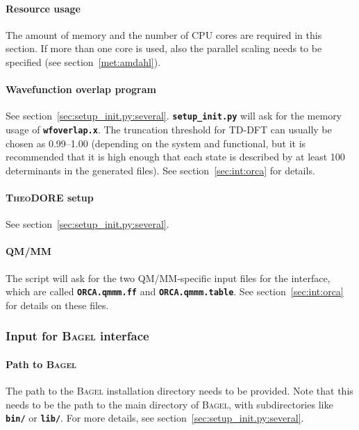 \documentclass[a4paper,10pt,DIV=15,openany]{scrbook}
\newcommand{\ttt}[1]{\textbf{\texttt{#1}}}
\begin{document}
\paragraph{Resource usage}

The amount of memory and the number of CPU cores are required in this section. If more than one core is used, also the parallel scaling needs to be specified (see section~\ref{met:amdahl}).

\paragraph{Wavefunction overlap program}

See section~\ref{sec:setup_init.py:several}. \ttt{setup\_init.py} will ask for the memory usage of \ttt{wfoverlap.x}. The truncation threshold for TD-DFT can usually be chosen as 0.99--1.00 (depending on the system and functional, but it is recommended that it is high enough that each state is described by at least 100 determinants in the generated files). See section~\ref{sec:int:orca} for details.

\paragraph{\textsc{TheoDORE} setup}

See section~\ref{sec:setup_init.py:several}. 

\paragraph{QM/MM}

The script will ask for the two QM/MM-specific input files for the interface, which are called \ttt{ORCA.qmmm.ff} and \ttt{ORCA.qmmm.table}.
See section~\ref{sec:int:orca} for details on these files.


\subsubsection{Input for \textsc{Bagel} interface}\label{sec:setup_init.py:bagel}

\paragraph{Path to \textsc{Bagel}}

The path to the \textsc{Bagel} installation directory needs to be provided.
Note that this needs to be the path to the main directory of \textsc{Bagel}, with subdirectories like \ttt{bin/} or \ttt{lib/}.
For more details, see section~\ref{sec:setup_init.py:several}.
\end{document}
